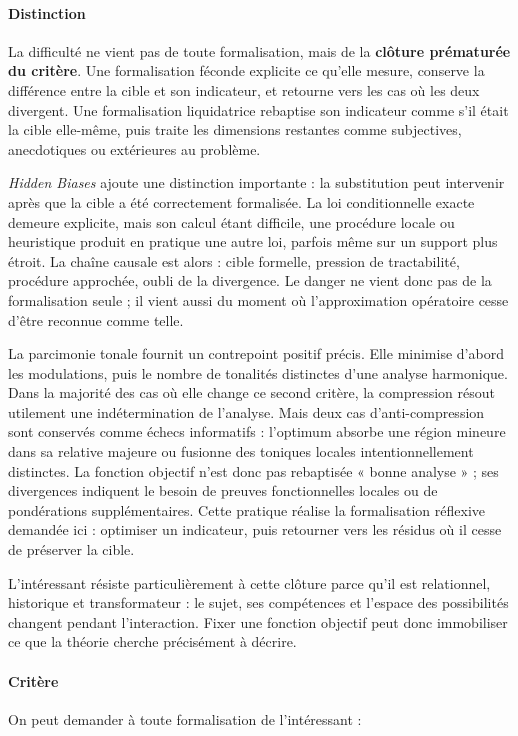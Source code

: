 \documentclass[10pt,a4paper]{article}
\begin{document}
\paragraph{Distinction}
La difficulté ne vient pas de toute formalisation, mais de la \textbf{clôture prématurée du critère}. Une formalisation féconde explicite ce qu'elle mesure, conserve la différence entre la cible et son indicateur, et retourne vers les cas où les deux divergent. Une formalisation liquidatrice rebaptise son indicateur comme s'il était la cible elle-même, puis traite les dimensions restantes comme subjectives, anecdotiques ou extérieures au problème.

\emph{Hidden Biases} ajoute une distinction importante : la substitution peut intervenir après que la cible a été correctement formalisée. La loi conditionnelle exacte demeure explicite, mais son calcul étant difficile, une procédure locale ou heuristique produit en pratique une autre loi, parfois même sur un support plus étroit. La chaîne causale est alors : cible formelle, pression de tractabilité, procédure approchée, oubli de la divergence. Le danger ne vient donc pas de la formalisation seule ; il vient aussi du moment où l'approximation opératoire cesse d'être reconnue comme telle.

La parcimonie tonale fournit un contrepoint positif précis. Elle minimise d'abord les modulations, puis le nombre de tonalités distinctes d'une analyse harmonique. Dans la majorité des cas où elle change ce second critère, la compression résout utilement une indétermination de l'analyse. Mais deux cas d'anti-compression sont conservés comme échecs informatifs : l'optimum absorbe une région mineure dans sa relative majeure ou fusionne des toniques locales intentionnellement distinctes. La fonction objectif n'est donc pas rebaptisée « bonne analyse » ; ses divergences indiquent le besoin de preuves fonctionnelles locales ou de pondérations supplémentaires. Cette pratique réalise la formalisation réflexive demandée ici : optimiser un indicateur, puis retourner vers les résidus où il cesse de préserver la cible.

L'intéressant résiste particulièrement à cette clôture parce qu'il est relationnel, historique et transformateur : le sujet, ses compétences et l'espace des possibilités changent pendant l'interaction. Fixer une fonction objectif peut donc immobiliser ce que la théorie cherche précisément à décrire.

\paragraph{Critère}
On peut demander à toute formalisation de l'intéressant :
\end{document}
